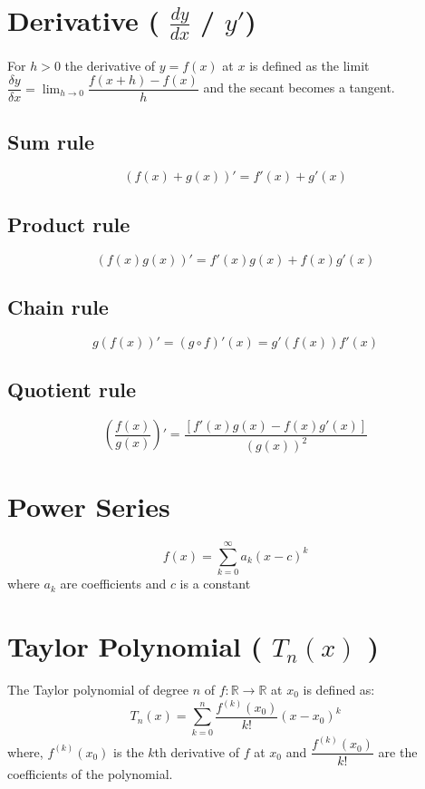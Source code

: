 \section{Derivative ( $\displaystyle\frac{dy}{dx}$ / $y'$)}\label{Derivative}

For $h > 0$ the derivative of $y = f(x)$ at $x$ is defined as the limit \( \displaystyle\dfrac{\delta y}{\delta x} = \lim_{h\rightarrow 0}\displaystyle\dfrac{f(x + h) - f(x)}{h} \) and the secant becomes a tangent.

\subsection{Sum rule}
\[
    (f(x) + g(x))' = f'(x) + g'(x)
\]

\subsection{Product rule}
\[
    (f(x)g(x))' = f'(x)g(x) + f(x)g'(x)
\]

\subsection{Chain rule}
\[
    g(f(x))' = (g \circ f)'(x) = g'(f(x))f'(x)
\]

\subsection{Quotient rule}
\[
    \left( \displaystyle\dfrac{f(x)}{g(x)} \right)' = \displaystyle\dfrac{[f'(x)g(x) - f(x)g'(x)]}{(g(x))^2}
\]

\section{Power Series}\label{Power Series}
\[
    f(x) = \sum_{k=0}^{\infty} a_k (x-c)^k
\]
where $a_k$ are coefficients and $c$ is a constant

\section{Taylor Polynomial ( $T_n(x)$ )}\label{Taylor Polynomial}
The Taylor polynomial of degree $n$ of $f : \mathbb{R} \rightarrow \mathbb{R}$ at $x_0$ is defined as: 
\[
    T_n(x) = \sum_{k=0}^{n}\displaystyle\dfrac{f^{(k)}(x_0)}{k!}(x-x_0)^k
\]
where, $f^{(k)}(x_0)$ is the $k$th derivative of $f$ at $x_0$ and $\displaystyle\dfrac{f^{(k)}(x_0)}{k!}$ are the coefficients of the polynomial.


